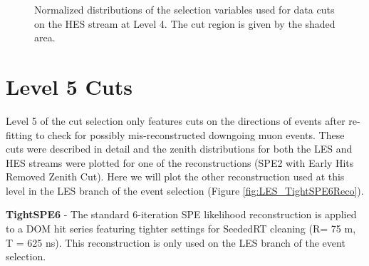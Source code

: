 \documentclass{gatech-thesis}
\begin{document}
\begin{figure}
\caption[L4 HES Cut Distributions]{Normalized distributions of the selection variables used for data cuts on the HES stream at Level 4. The cut region is given by the shaded area.} 
\label{fig:HESL4ParameterPlots}
\end{figure}

\pagebreak
\section{Level 5 Cuts}
Level 5 of the cut selection only features cuts on the directions of events after re-fitting to check for possibly mis-reconstructed downgoing muon events. These cuts were described in detail and the zenith distributions for both the LES and HES streams were plotted for one of the reconstructions (SPE2 with Early Hits Removed Zenith Cut). Here we will plot the other reconstruction used at this level in the LES branch of the event selection (Figure \ref{fig:LES_TightSPE6Reco}).

\textbf{TightSPE6} - The standard 6-iteration SPE likelihood reconstruction is applied to a DOM hit series featuring tighter settings for SeededRT cleaning (R= 75 m, T = 625 ns). This reconstruction is only used on the LES branch of the event selection.
\end{document}
